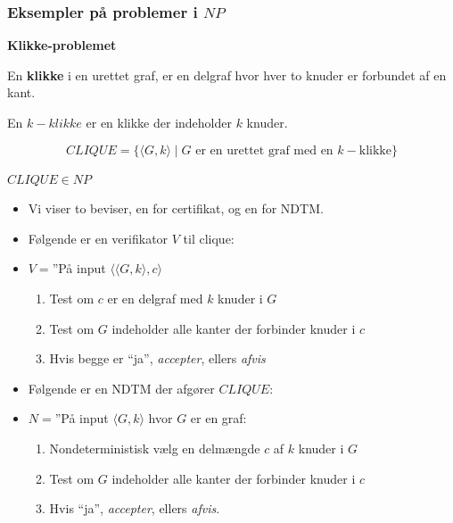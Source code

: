 \begin{frame}[allowframebreaks]
  \frametitle{Eksempler på problemer i $NP$}

  \item \textbf{Klikke-problemet}
  \item En \textbf{klikke} i en urettet graf, er en delgraf hvor hver to knuder er forbundet af en kant.
  \item En $k-klikke$ er en klikke der indeholder $k$ knuder.

  \begin{equation}
CLIQUE = \{\langle G, k \rangle \mid G \text{ er en urettet graf med en }k-\text{klikke}\}
  \end{equation}

  \begin{theorem}
$CLIQUE \in NP$
  \end{theorem}
 \begin{itemize}
   \item Vi viser to beviser, en for certifikat, og en for NDTM.
   \item Følgende er en verifikator $V$ til clique:
   \item $V = $''På input \(\langle \langle G, k \rangle , c \rangle \)
         \begin{enumerate}
           \item Test om $c$ er en delgraf med $k$ knuder i $G$
           \item Test om $G$ indeholder alle kanter der forbinder knuder i $c$
           \item Hvis begge er ``ja'', \textit{accepter}, ellers \textit{afvis}
         \end{enumerate}
   \item Følgende er en NDTM der afgører $CLIQUE$:
   \item $N = $''På input $\langle G , k \rangle $ hvor $G$ er en graf:
         \begin{enumerate}
           \item Nondeterministisk vælg en delmængde $c$ af $k$ knuder i $G$
           \item Test om $G$ indeholder alle kanter der forbinder knuder i $c$
           \item Hvis ``ja'', \textit{accepter}, ellers \textit{afvis}.
         \end{enumerate}


 \end{itemize}

\end{frame}



